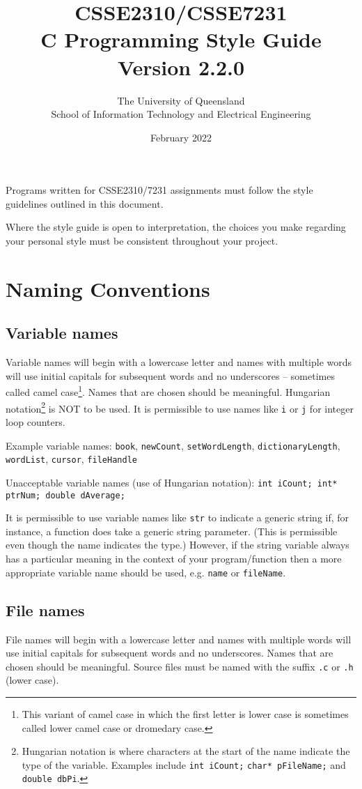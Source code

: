 \documentclass{article}
\title{CSSE2310/CSSE7231\\C Programming Style Guide\\Version 2.2.0}
\author{The University of Queensland\\School of Information Technology and Electrical Engineering}
\date{February 2022}
\begin{document}
\maketitle

Programs written for CSSE2310/7231 assignments must follow the style guidelines outlined in this document.

Where the style guide is open to interpretation, the choices you make regarding your personal style 
must be consistent throughout your project.

\section{Naming Conventions}
\subsection{Variable names}
\label{sec:naming-variable}
Variable names will begin with a lowercase letter and names with multiple words 
will use initial capitals for subsequent words and no underscores -- sometimes called camel case\footnote{This variant of camel case 
in which the first letter is lower case is sometimes called lower camel case or dromedary case.}. 
Names that are chosen should be meaningful. Hungarian notation\footnote{Hungarian notation is where characters at the start of 
the name indicate the type of the variable. Examples include \texttt{int iCount;} \texttt{char* pFileName;} and
\texttt{double dbPi}.}
 is NOT to be used.
It is permissible to use names like \texttt{i} or \texttt{j} for integer loop counters.

Example variable names: \texttt{book}, \texttt{newCount}, \texttt{setWordLength}, \texttt{dictionaryLength}, 
\texttt{wordList}, \texttt{cursor}, \texttt{fileHandle}

Unacceptable variable names (use of Hungarian notation): \texttt{int iCount; int* ptrNum; double dAverage;}

It is permissible to use variable names like \texttt{str} to indicate a generic string if, for instance, a function does take a generic
string parameter. (This is permissible even though the name indicates the type.) However, if the string variable always has a particular meaning in the context of your program/function then a more appropriate variable name should
be used, e.g. \texttt{name} or \texttt{fileName}.
\subsection{File names}
\label{sec:naming-files}
File names will begin with a lowercase letter and names with multiple words 
will use initial capitals for subsequent words and no underscores. 
Names that are chosen should be meaningful. Source files must be named with the suffix \texttt{.c} or \texttt{.h} (lower case).
\end{document}
